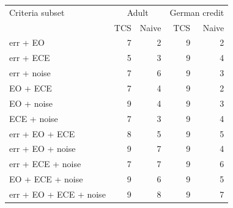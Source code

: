 \begin{tabular}{lrrrr}\toprule
Criteria subset & \multicolumn{2}{c}{Adult} & \multicolumn{2}{c}{German credit} \\
 & TCS & Naive & TCS & Naive \\\midrule
err + EO & 7 & 2 & 9 & 2 \\
err + ECE & 5 & 3 & 9 & 4 \\
err + noise & 7 & 6 & 9 & 3 \\
EO + ECE & 7 & 4 & 9 & 2 \\
EO + noise & 9 & 4 & 9 & 3 \\
ECE + noise & 7 & 3 & 9 & 4 \\
err + EO + ECE & 8 & 5 & 9 & 5 \\
err + EO + noise & 9 & 7 & 9 & 4 \\
err + ECE + noise & 7 & 7 & 9 & 6 \\
EO + ECE + noise & 9 & 6 & 9 & 5 \\
err + EO + ECE + noise & 9 & 8 & 9 & 7 \\
\bottomrule\end{tabular}